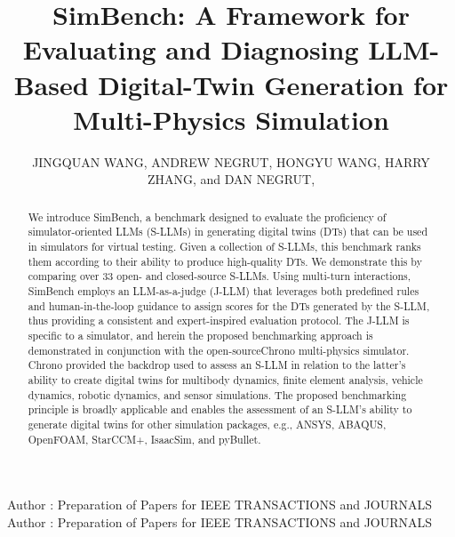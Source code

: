 \documentclass{ieeeaccess}
\begin{document}

\title{SimBench: A Framework for Evaluating and Diagnosing LLM-Based Digital-Twin Generation for Multi-Physics Simulation}


\author{\uppercase{Jingquan Wang},
\uppercase{Andrew Negrut}, \uppercase{Hongyu Wang}, \uppercase{Harry Zhang},
and \uppercase{Dan Negrut},
}

\address[1]{Univeristy of Wisconsin-Madison, Madison, WI 53706 USA}
\address[2]{Department of Computer Science,  Rice University, Houston, TX 77005 USA}

\markboth
{Author \headeretal: Preparation of Papers for IEEE TRANSACTIONS and JOURNALS}
{Author \headeretal: Preparation of Papers for IEEE TRANSACTIONS and JOURNALS}



\begin{abstract}
    We introduce SimBench, a benchmark designed to evaluate the proficiency of simulator-oriented LLMs (S-LLMs) in generating digital twins (DTs) that can be used in simulators for virtual testing. Given a collection of S-LLMs, this benchmark ranks them according to their ability to produce high-quality DTs. We demonstrate this by comparing over 33 open- and closed-source S-LLMs. Using multi-turn interactions, SimBench employs an LLM-as-a-judge (J-LLM) that leverages both predefined rules and human-in-the-loop guidance to assign scores for the DTs generated by the S-LLM, thus providing a consistent and expert-inspired evaluation protocol. The J-LLM is specific to a simulator, and herein the proposed benchmarking approach is demonstrated in conjunction with the open-sourceChrono multi-physics simulator. Chrono provided the backdrop used to assess an S-LLM in relation to the latter's ability to create digital twins for multibody dynamics, finite element analysis, vehicle dynamics, robotic dynamics, and sensor simulations. The proposed benchmarking principle is broadly applicable and enables the assessment of an S-LLM's ability to generate digital twins for other simulation packages, e.g., ANSYS, ABAQUS, OpenFOAM, StarCCM+, IsaacSim, and pyBullet.

\end{abstract}
\end{document}
